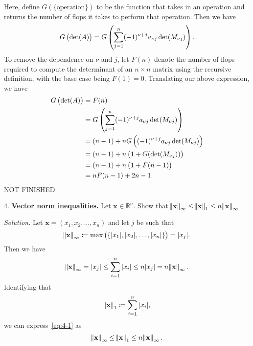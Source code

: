 \documentclass{article}
\def\*#1{\mathbf{#1}}
\newcommand{\R}{\mathbb{R}}
\begin{document}
Here, define $G(\text{\{operation\}})$ to be the function that takes in
an operation and returns the number of flops it takes to perform that
operation. Then we have
%
\begin{equation*}
    G\del{ \det(A) }
        = G\del{ \sum_{j = 1}^n (-1)^{\nu + j} a_{\nu j} \det(M_{\nu j}) }
        .
\end{equation*}
%
To remove the dependence on $\nu$ and $j$, let $F(n)$ denote
the number of flops required to compute the determinant of
an $n \times n$ matrix using the recursive definition,
with the base case being $F(1) = 0$.
Translating our above expression, we have
%
\begin{align*}
    G\del{ \det(A) }
        &= F(n) \\
        &= G\del{ \sum_{j = 1}^n (-1)^{\nu + j} a_{\nu j} \det(M_{\nu j}) } \\
        &= (n - 1) + n G\del{ (-1)^{\nu + j} a_{\nu j} \det(M_{\nu j}) } \\
        &= (n - 1) + n \del{ 1 + G(\det(M_{\nu j})) } \\
        &= (n - 1) + n \del{1 + F(n - 1)} \\
        &= n F(n - 1)  + 2n - 1
        .
\end{align*}
%
NOT FINISHED

\newpage

4. \textbf{Vector norm inequalities.}
Let $\*x \in \R^n$. Show that
$\enVert{\*x}_\infty \leq \enVert{\*x}_1 \leq n \enVert{\*x}_\infty$.

\textit{Solution.}
Let $\*x = (x_1, x_2, \ldots, x_n)$ and let $j$ be such that
%
\begin{equation*}
    \enVert{\*x}_\infty \coloneqq \max\del{\{|x_1|, |x_2|, \ldots, |x_n|\}} = |x_j|
    .
\end{equation*}
%
Then we have
%
\begin{equation}
    \enVert{\*x}_\infty = |x_j| \leq \sum_{i = 1}^n |x_i| \leq n |x_j| = n \enVert{\*x}_\infty
    \label{eq:4-1}
    .
\end{equation}
%
Identifying that
%
\begin{equation*}
    \enVert{\*x}_1 \coloneqq \sum_{i = 1}^n |x_i|
    ,
\end{equation*}
%
we can express~\eqref{eq:4-1} as
%
\begin{equation*}
    \enVert{\*x}_\infty \leq \enVert{\*x}_1 \leq n \enVert{\*x}_\infty
.
\end{equation*}

\newpage
\end{document}
